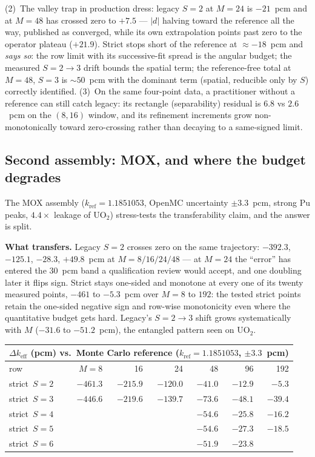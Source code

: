 \documentclass[11pt,a4paper]{article}
\begin{document}
(2)~The valley trap in production dress: legacy $S{=}2$ at $M{=}24$
is $-21$~pcm and at $M{=}48$ has crossed zero to $+7.5$ ---
$|d|$ halving toward the reference all the way, published as
converged, while its own extrapolation points past zero to the
operator plateau ($+21.9$).  Strict stops short of the reference at
$\approx$$-18$~pcm and \emph{says so}: the row limit with its
successive-fit spread is the angular budget; the measured
$S{=}2{\to}3$ drift bounds the spatial term; the reference-free total
at $M{=}48$, $S{=}3$ is $\sim$$50$~pcm with the dominant term
(spatial, reducible only by $S$) correctly identified.
(3)~On the same four-point data, a practitioner without a reference
can still catch legacy: its rectangle (separability) residual is
$6.8$ vs $2.6$~pcm on the $(8,16)$ window, and its refinement
increments grow non-monotonically toward zero-crossing rather than
decaying to a same-signed limit.

\subsection{Second assembly: MOX, and where the budget degrades}
\label{sec:mox}
The MOX assembly ($k_\mathrm{ref}=1.1851053$, OpenMC uncertainty
$\pm3.3$~pcm, strong Pu peaks,
$4.4\times$ leakage of UO$_2$) stress-tests the transferability
claim, and the answer is split.

\textbf{What transfers.} Legacy $S{=}2$ crosses zero on the same
trajectory: $-392.3$, $-125.1$, $-28.3$, $+49.8$~pcm at
$M=8/16/24/48$ --- at $M{=}24$ the ``error'' has entered the 30~pcm
band a qualification review would accept, and one doubling later it
flips sign. Strict stays one-sided and monotone at every one of its
twenty measured points, $-461$ to $-5.3$~pcm over $M=8$ to $192$:
the tested strict points retain the one-sided negative sign and
row-wise monotonicity even where the quantitative budget gets
hard.
Legacy's $S{=}2{\to}3$ shift grows
systematically with $M$ ($-31.6$ to $-51.2$~pcm), the entangled
pattern seen on UO$_2$.
\begin{center}
\begin{tabular}{lrrrrrr}
\multicolumn{7}{l}{$\Delta k_\mathrm{eff}$ (pcm) vs.\ Monte Carlo
reference ($k_\mathrm{ref}=1.1851053$, $\pm3.3$~pcm)}\\[2pt]
\toprule
row & $M{=}8$ & 16 & 24 & 48 & 96 & 192 \\
\midrule
strict\ $S{=}2$ & $-461.3$ & $-215.9$ & $-120.0$ & $-41.0$ & $-12.9$ & $-5.3$ \\
strict\ $S{=}3$ & $-446.6$ & $-219.6$ & $-139.7$ & $-73.6$ & $-48.1$ & $-39.4$ \\
strict\ $S{=}4$ & & & & $-54.6$ & $-25.8$ & $-16.2$ \\
strict\ $S{=}5$ & & & & $-54.6$ & $-27.3$ & $-18.5$ \\
strict\ $S{=}6$ & & & & $-51.9$ & $-23.8$ & \\
\bottomrule
\end{tabular}
\end{center}
\end{document}
